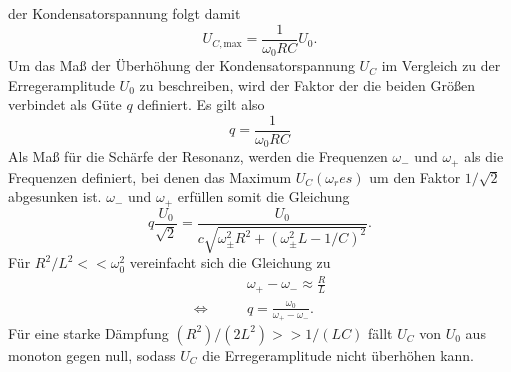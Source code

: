 der Kondensatorspannung folgt damit
\begin{equation*}
    U_{C, \text{max}} = \frac{1}{\omega_0 RC} U_0  .
\end{equation*}
Um das Maß der Überhöhung der Kondensatorspannung $U_C$ im Vergleich zu der Erregeramplitude $U_0$ zu beschreiben, wird der Faktor der die beiden
Größen verbindet als Güte $q$ definiert. Es gilt also
\begin{equation}
    q=\frac{1}{\omega_0RC}
    \label{eqn:gute}
\end{equation}
Als Maß für die Schärfe der Resonanz, werden die Frequenzen $\omega_-$ und $\omega_+$ als die Frequenzen definiert, bei denen das Maximum $U_C(\omega_res)$
um den Faktor $1/\sqrt{2}$ abgesunken ist. $\omega_-$ und $\omega_+$ erfüllen somit die Gleichung
\begin{equation*}
    q\frac{U_0}{\sqrt{2}}=\frac{U_0}{c\sqrt{\omega_{\pm}^2R^2+(\omega_{\pm}^2L-1/C)^2}} .
\end{equation*}
Für $R^2/L^2<<\omega_0^2$ vereinfacht sich die Gleichung zu
\begin{align*}
                    &\omega_+-\omega_-\approx \frac{R}{L} \\
    \Leftrightarrow \qquad &q=\frac{\omega_0}{\omega_+-\omega_-}    .
\end{align*}
Für eine starke Dämpfung $(R^2)/(2L^2)>>1/(LC)$ fällt $U_C$ von $U_0$ aus monoton gegen null, sodass $U_C$ die Erregeramplitude nicht überhöhen kann. 